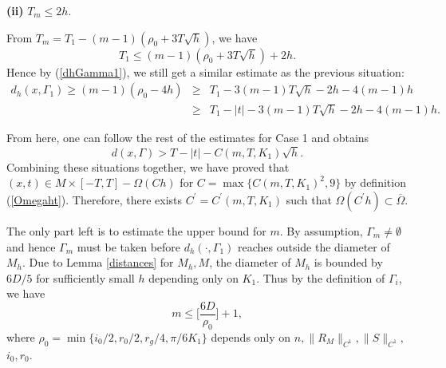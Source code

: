 \documentclass[11pt,letterpaper]{amsart}
\numberwithin{equation}{section}
\theoremstyle{definition}
\theoremstyle{plain}
\theoremstyle{definition}
\theoremstyle{plain}
\theoremstyle{definition}
\theoremstyle{plain}
\begin{document}
\smallskip
\noindent \textbf{(ii)} $T_m\leqslant 2h$.

From $T_m=T_1-(m-1)(\rho_0+3T\sqrt{h})$, we have
$$T_1\leqslant (m-1)(\rho_0+3T\sqrt{h})+2h.$$
Hence by (\ref{dhGamma1}), we still get a similar estimate as the previous situation:
\begin{eqnarray*}
d_h(x,\Gamma_1)\geqslant (m-1)(\rho_0-4h)&\geqslant& T_1-3(m-1)T\sqrt{h}-2h-4(m-1)h \\
&\geqslant& T_1-|t|-3(m-1)T\sqrt{h}-2h-4(m-1)h.
\end{eqnarray*}

\smallskip
From here, one can follow the rest of the estimates for Case 1 and obtains
$$d(x,\Gamma)>T-|t|-C(m,T,K_1)\sqrt{h}.$$
Combining these situations together, we have proved that $(x,t)\in M\times [-T,T]-\Omega(Ch)$ for $C=\max\{C(m,T,K_1)^2,9\}$ by definition (\ref{Omegaht}). Therefore, there exists $C^{\prime}=C^{\prime}(m,T,K_1)$ such that $\Omega(C^{\prime}h)\subset \overline{\Omega}$. 

The only part left is to estimate the upper bound for $m$. By assumption, $\Gamma_m\neq\emptyset$ and hence $\Gamma_m$ must be taken before $d_h(\cdot,\Gamma_1)$ reaches outside the diameter of $M_h$. Due to Lemma \ref{distances} for $M_h,M$, the diameter of $M_h$ is bounded by $6 D/5$ for sufficiently small $h$ depending only on $K_1$. Thus by the definition of $\Gamma_i$, we have
$$m\leqslant\big[\frac{6D}{\rho_0}\big]+1,$$
where $\rho_0=\min\big\{i_0/2,r_0/2,r_g/4,\pi/6K_1 \big\}$ depends only on $n,\|R_M\|_{C^1},\|S\|_{C^1},$ $i_0,r_0$.
\end{document}
